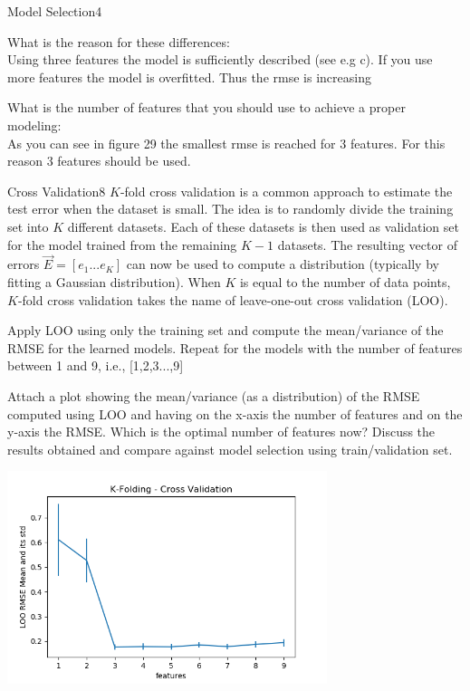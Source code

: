 \begin{questions}
\begin{question}{Model Selection}{4}
\begin{answer}
	What is the reason for these differences:\\
	Using three features the model is sufficiently described (see e.g c). If you use more features the model is overfitted. Thus the rmse is increasing
	
	
	What is the number of features that you should use to achieve a proper modeling:\\
	As you can see in figure 29 the smallest rmse is reached for 3 features. For this reason 3 features should be used.

	\end{answer}
	\end{question}
	
	
	\begin{question}{Cross Validation}{8}
		$K$-fold cross validation is a common approach to estimate the test error when the dataset is small.
		The idea is to randomly divide the training set into $K$ different datasets.
		Each of these datasets is then used as validation set for the model trained from the remaining $K-1$ datasets.
		The resulting vector of errors $\vec E = [ e_1... e_K ]$ can now be used to compute a distribution (typically by fitting a Gaussian distribution).
		When $K$ is equal to the number of data points, $K$-fold cross validation takes the name of leave-one-out cross validation (LOO).
		
		Apply LOO using only the training set and compute the mean/variance of the RMSE for the learned models. 
		Repeat for the models with the number of features between 1 and 9, i.e.,  [1,2,3...,9]
		
		Attach a plot showing the mean/variance (as a distribution) of the RMSE computed using LOO and having on the x-axis the number of features and on the y-axis the RMSE.
		Which is the optimal number of features now? 
		Discuss the results obtained and compare against model selection using train/validation set.
		
\begin{answer}
	\begin{center}
		\includegraphics[width=0.7\textwidth]{img/3f.png} 
	\end{center}
	

\end{answer}
\end{question}
\end{questions}
